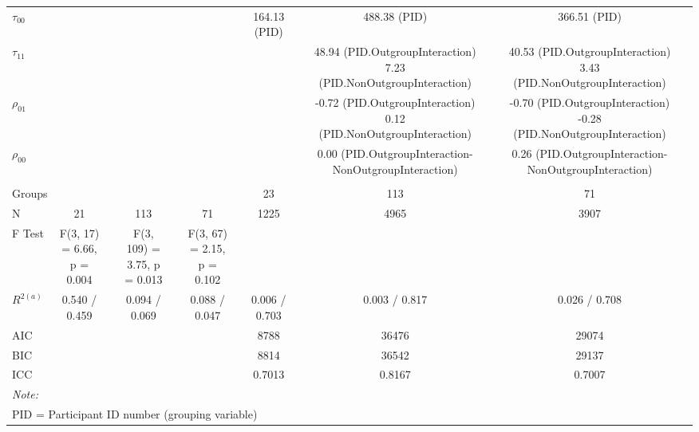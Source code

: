 \begin{landscape}
\begin{table}
\begin{minipage}[t][\textheight][t]{\textwidth}
{\begin{tabular}[t]{lcccccccccccc}
\hspace{1em}$\tau_{00}$ &  &  &  &  &  &  & 164.13 (PID) &  & 488.38 (PID) &  & 366.51 (PID) & \\
\hspace{1em}$\tau_{11}$ &  &  &  &  &  &  &  &  & \makecell[r]{48.94 (PID.OutgroupInteraction)\\ 7.23 (PID.NonOutgroupInteraction)} &  & \makecell[r]{40.53 (PID.OutgroupInteraction)\\ 3.43 (PID.NonOutgroupInteraction)} & \\
\hspace{1em}$\rho_{01}$ &  &  &  &  &  &  &  &  & \makecell[l]{-0.72 (PID.OutgroupInteraction)\\ 0.12 (PID.NonOutgroupInteraction)} &  & \makecell[l]{-0.70 (PID.OutgroupInteraction)\\-0.28 (PID.NonOutgroupInteraction)} & \\
\hspace{1em}$\rho_{00}$ &  &  &  &  &  &  &  &  & 0.00 (PID.OutgroupInteraction-NonOutgroupInteraction) &  & 0.26 (PID.OutgroupInteraction-NonOutgroupInteraction) & \\
\addlinespace[0.3em]
\multicolumn{13}{l}{\textbf{Fit}}\\
\hspace{1em}Groups &  &  &  &  &  &  & 23 &  & 113 &  & 71 & \\
\hspace{1em}N & 21 &  & 113 &  & 71 &  & 1225 &  & 4965 &  & 3907 & \\
\hspace{1em}F Test & F(3, 17) = 6.66, p =  0.004 &  & F(3, 109) = 3.75, p =  0.013 &  & F(3, 67) = 2.15, p =  0.102 &  &  &  &  &  &  & \\
\hspace{1em}$R^{2 (a)}$ & 0.540 / 0.459 &  & 0.094 / 0.069 &  & 0.088 / 0.047 &  & 0.006 / 0.703 &  & 0.003 / 0.817 &  & 0.026 / 0.708 & \\
\hspace{1em}AIC &  &  &  &  &  &  & 8788 &  & 36476 &  & 29074 & \\
\hspace{1em}BIC &  &  &  &  &  &  & 8814 &  & 36542 &  & 29137 & \\
\hspace{1em}ICC &  &  &  &  &  &  & 0.7013 &  & 0.8167 &  & 0.7007 & \\
\bottomrule
\multicolumn{13}{l}{\rule{0pt}{1em}\textit{Note: }}\\
\multicolumn{13}{l}{\rule{0pt}{1em}PID = Participant ID number (grouping variable)}\\

\end{tabular}}
\end{minipage}
\end{table}
\end{landscape}

